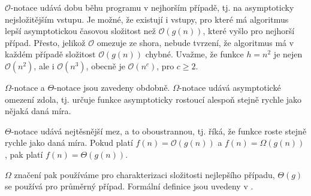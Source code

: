 \documentclass[12pt]{report}			%
\begin{document}
			$\mathcal{O}$-notace udává dobu běhu programu v nejhorším případě, tj. na asymptoticky nejsložitějším vstupu. Je možné, že existují i vstupy, pro které má algoritmus lepší asymptotickou časovou složitost než $\mathcal{O}(g(n))$, které vyšlo pro nejhorší případ. Přesto, jelikož $\mathcal{O}$ omezuje ze shora, nebude tvrzení, že algoritmus má v každém případě složitost $\mathcal{O}(g(n))$ chybné. Uvažme, že funkce $h=n^2$ je nejen $\mathcal{O}(n^2)$, ale i $\mathcal{O}(n^3)$, obecně je $\mathcal{O}(n^c)$, pro $c \geq 2$.
			
			$\Omega$-notace a $\Theta$-notace jsou zavedeny obdobně. $\Omega$-notace udává asymptotické omezení zdola, tj. určuje funkce asymptoticky rostoucí alespoň stejně rychle jako nějaká daná míra.
			
			$\Theta$-notace udává nejtěsnější mez, a to oboustrannou, tj. říká, že funkce roste stejně rychle jako daná míra. Pokud platí 
$f(n) = \mathcal{O}(g(n))$ a $f(n) = \Omega(g(n))$, pak platí $f(n) = \Theta(g(n))$.

			$\Omega$ značení pak používáme pro charakterizaci složitosti nejlepšího případu, $\Theta(g)$ se používá pro průměrný případ.
			Formální definice jsou uvedeny v \cite{intro}.
			

			
			
\end{document}
